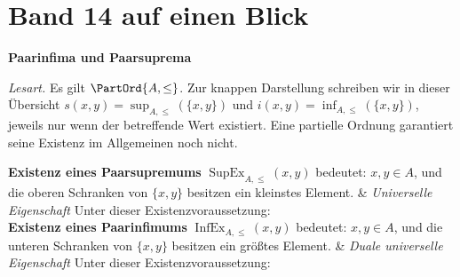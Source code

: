 \chapter[Band 14: Paarinfima und Paarsuprema]{Band 14 auf einen Blick}
\noindent\textbf{Paarinfima und Paarsuprema}\par\medskip
\noindent\emph{Lesart.} Es gilt \(\PartOrd{A,\leq}\).
Zur knappen Darstellung schreiben wir in dieser Übersicht
\(s(x,y)=\sup_{A,\leq}(\{x,y\})\) und
\(i(x,y)=\inf_{A,\leq}(\{x,y\})\), jeweils nur wenn der
betreffende Wert existiert. Eine partielle Ordnung garantiert
seine Existenz im Allgemeinen noch nicht.
\begin{BandUebersicht}
\textbf{Existenz eines Paarsupremums}
\(\operatorname{SupEx}_{A,\leq}(x,y)\) bedeutet:
\(x,y\in A\), und die oberen Schranken von \(\{x,y\}\)
besitzen ein kleinstes Element.
&
\textit{Universelle Eigenschaft}
Unter dieser Existenzvoraussetzung:
\\
\addlinespace[.8ex]
\textbf{Existenz eines Paarinfimums}
\(\operatorname{InfEx}_{A,\leq}(x,y)\) bedeutet:
\(x,y\in A\), und die unteren Schranken von \(\{x,y\}\)
besitzen ein größtes Element.
&
\textit{Duale universelle Eigenschaft}
Unter dieser Existenzvoraussetzung:
\end{BandUebersicht}
